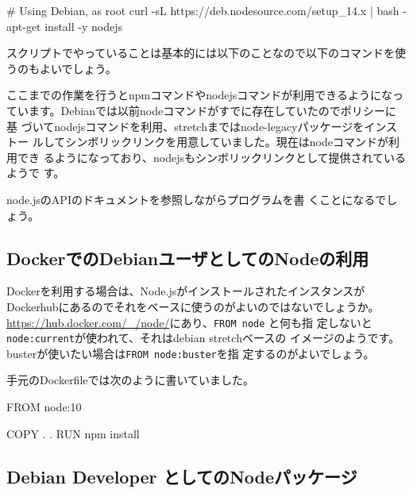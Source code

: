 \documentclass[mingoth,a4paper]{jsarticle}
\begin{document}
\begin{commandline}
# Using Debian, as root
curl -sL https://deb.nodesource.com/setup_14.x | bash -
apt-get install -y nodejs
\end{commandline}

スクリプトでやっていることは基本的には以下のことなので以下のコマンドを使うのもよいでしょう。


ここまでの作業を行うとnpmコマンドやnodejsコマンドが利用できるようになっ
ています。Debianでは以前nodeコマンドがすでに存在していたのでポリシーに基
づいてnodejsコマンドを利用、stretchまではnode-legacyパッケージをインストー
ルしてシンボリックリンクを用意していました。現在はnodeコマンドが利用でき
るようになっており、nodejsもシンボリックリンクとして提供されているようで
す。

node.jsのAPIのドキュメント\cite{nodejs-api}を参照しながらプログラムを書
くことになるでしょう。


\subsection{DockerでのDebianユーザとしてのNodeの利用}

Dockerを利用する場合は、Node.jsがインストールされたインスタンスが
Dockerhubにあるのでそれをベースに使うのがよいのではないでしょうか。
\url{https://hub.docker.com/_/node/}にあり、\texttt{FROM node} と何も指
定しないと\texttt{node:current}が使われて、それはdebian stretchベースの
イメージのようです。busterが使いたい場合は\texttt{FROM node:buster}を指
定するのがよいでしょう。

手元のDockerfileでは次のように書いていました。

\begin{commandline}
FROM node:10

COPY . .
RUN npm install
\end{commandline}

\subsection{Debian Developer としてのNodeパッケージ}
\end{document}
